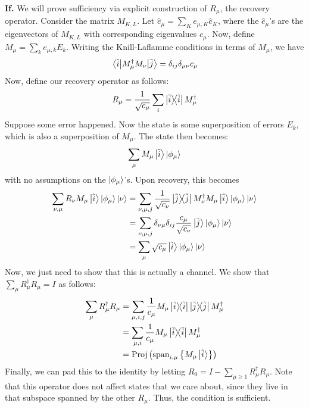 \begin{theorem}
\begin{proof*}
        \textbf{If.} We will prove sufficiency via explicit construction of $R_{\mu}$, the recovery operator. Consider the matrix $M_{K, L}$.
        Let $\hat{e}_{\mu} = \sum_K e_{\mu, K} \hat{e}_K$, where the $\hat{e}_{\mu}$'s are the eigenvectors of $M_{K, L}$ with corresponding eigenvalues $c_{\mu}$. Now, define $M_{\mu} = \sum_k e_{\mu, k} E_k$.
        Writing the Knill-Laflamme conditions in terms of $M_{\mu}$, we have
        \begin{align*}
            \mel{\tilde{i}}{M_{\mu}^{\dagger} M_{\nu}}{\tilde{j}} = \delta_{ij} \delta_{\mu \nu} c_{\mu}
        \end{align*}
        Now, define our recovery operator as follows:
        \[ R_{\mu}  = \frac{1}{\sqrt{c_{\mu}}} \sum_i \ketbra{\tilde{i}} M_{\mu}^{\dagger} \]
        Suppose some error happened. Now the state is some superposition of errors $E_k$, which
        is also a superposition of $M_{\mu}$. The state then becomes:
        \[ \sum_{\mu} M_{\mu} \ket{\tilde{i}} \ket{\phi_{\mu}} \]
        with no assumptions on the $\ket{\phi_\mu}$'s. Upon recovery, this becomes
        \begin{align*}
            \sum_{\nu, \mu} R_{\nu} M_{\mu} \ket{\tilde{i}} \ket{\phi_{\mu}} \ket{\nu}
            &= \sum_{\nu, \mu, j} \frac{1}{\sqrt{c_{\nu}}} \ketbra{\tilde{j}} M_{\nu}^{\dagger} M_{\mu} \ket{\tilde{i}} \ket{\phi_{\mu}} \ket{\nu} \\
            &= \sum_{\nu, \mu, j} \delta_{\nu \mu} \delta_{ij} \frac{c_{\mu}}{\sqrt{c_{\nu}}} \ket{\tilde{j}} \ket{\phi_{\mu}} \ket{\nu} \\
            &= \sum_{\mu} \sqrt{c_{\mu}} \ket{\tilde{i}} \ket{\phi_{\mu}} \ket{\nu}
        \end{align*}
        Now, we just need to show that this is actually a channel. We show that $\sum_{\mu} R_{\mu}^{\dagger} R_{\mu} = I$ as follows:
        \begin{align*}
            \sum_{\mu} R_{\mu}^{\dagger} R_{\mu} &= \sum_{\mu, i, j} \frac{1}{c_{\mu}} M_\mu \ketbra{\tilde{i}} \ketbra{\tilde{j}} M_{\mu}^{\dagger} \\
            &= \sum_{\mu, i} \frac{1}{c_{\mu}} M_{\mu} \ketbra{\tilde{i}} M_{\mu}^{\dagger} \\
            &= \textrm{Proj}\left(\textrm{span}_{i, \mu}\left\{ M_{\mu} \ket{\tilde{i}}\right\}\right)
        \end{align*}
        Finally, we can pad this to the identity by letting $R_0 = I - \sum_{\mu \geq 1} R_{\mu}^{\dagger} R_{\mu}$.
        Note that this operator does not affect states that we care about, since they live in that subspace spanned by the
        other $R_{\mu}$. Thus, the condition is sufficient.
    \end{proof*}
\end{theorem}

